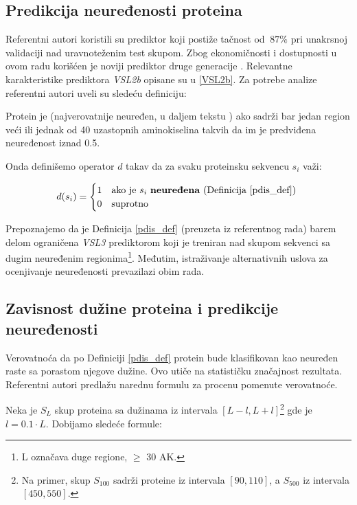 \subsection{Predikcija neuređenosti proteina}
\label{naredno}

Referentni autori koristili su prediktor  koji
postiže tačnost od $~87\%$ pri unakrsnoj validaciji nad uravnoteženim test
skupom.  Zbog ekonomičnosti i dostupnosti u ovom radu korišćen je noviji
prediktor druge generacije .
Relevantne karakteristike prediktora \textit{VSL2b} opisane su u \ref{VSL2b}.
Za potrebe analize referentni autori  uveli su sledeću definiciju:

\begin{definicija}
\label{pdis_def}
Protein je  
(najverovatnije neuređen, u daljem tekstu ) ako sadrži bar
jedan region veći ili jednak od 40 uzastopnih aminokiselina takvih da im je
predviđena neuređenost iznad 0.5. 
\end{definicija}

Onda definišemo operator $d$ takav da za svaku proteinsku sekvencu $s_i$ važi:

\[   
  d(s_i) = 
    \begin{cases}
    1 & \text{ako je  $s_i$ \textbf{neuređena} (Definicija \ref{pdis_def}) }\\
      0 & \text{suprotno}
    \end{cases}
\]

Prepoznajemo da je Definicija \ref{pdis_def} (preuzeta iz referentnog rada)
barem delom ograničena \textit{VSL3} prediktorom koji je treniran nad skupom
sekvenci sa dugim neuređenim regionima\footnote{L označava duge regione, $\ge$
30 AK.}.  Međutim, istraživanje alternativnih uslova za ocenjivanje
neuređenosti prevazilazi obim rada.

\subsection{Zavisnost dužine proteina i predikcije neuređenosti}

Verovatnoća da po Definiciji \ref{pdis_def} protein bude klasifikovan kao
neuređen raste sa porastom njegove dužine. Ovo utiče na statističku značajnost
rezultata.  Referentni autori predlažu narednu formulu za procenu pomenute
verovatnoće.

Neka je $S_L$ skup proteina sa dužinama iz intervala $[L-l, L+l]$\footnote{Na
primer, skup $S_{100}$ sadrži proteine iz intervala $[90, 110]$, a $S_{500}$ iz
intervala $[450, 550]$.} gde je $l = 0.1 \cdot L$. Dobijamo sledeće formule:

